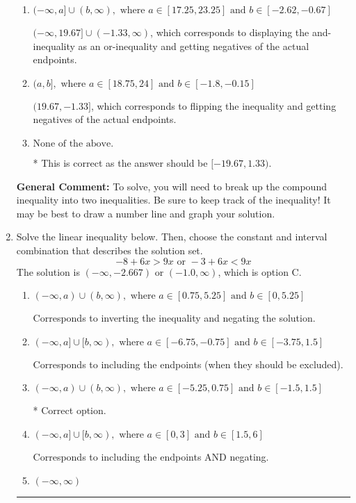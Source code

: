 \documentclass{extbook}[14pt]
\newcommand{\litem}[1]{\item #1

\rule{\textwidth}{0.4pt}}
\begin{document}
\begin{enumerate}
{\begin{enumerate}[label=\Alph*.]
$[19.67, -1.33)$, which is the correct interval but negatives of the actual endpoints.
\item \( (-\infty, a] \cup (b, \infty), \text{ where } a \in [17.25, 23.25] \text{ and } b \in [-2.62, -0.67] \)

$(-\infty, 19.67] \cup (-1.33, \infty)$, which corresponds to displaying the and-inequality as an or-inequality and getting negatives of the actual endpoints.
\item \( (a, b], \text{ where } a \in [18.75, 24] \text{ and } b \in [-1.8, -0.15] \)

$(19.67, -1.33]$, which corresponds to flipping the inequality and getting negatives of the actual endpoints.
\item \( \text{None of the above.} \)

* This is correct as the answer should be $[-19.67, 1.33)$.
\end{enumerate}

\textbf{General Comment:} To solve, you will need to break up the compound inequality into two inequalities. Be sure to keep track of the inequality! It may be best to draw a number line and graph your solution.
}
\litem{
Solve the linear inequality below. Then, choose the constant and interval combination that describes the solution set.
\[ -8 + 6 x > 9 x \text{ or } -3 + 6 x < 9 x \]The solution is \( (-\infty, -2.667) \text{ or } (-1.0, \infty) \), which is option C.\begin{enumerate}[label=\Alph*.]
\item \( (-\infty, a) \cup (b, \infty), \text{ where } a \in [0.75, 5.25] \text{ and } b \in [0, 5.25] \)

Corresponds to inverting the inequality and negating the solution.
\item \( (-\infty, a] \cup [b, \infty), \text{ where } a \in [-6.75, -0.75] \text{ and } b \in [-3.75, 1.5] \)

Corresponds to including the endpoints (when they should be excluded).
\item \( (-\infty, a) \cup (b, \infty), \text{ where } a \in [-5.25, 0.75] \text{ and } b \in [-1.5, 1.5] \)

 * Correct option.
\item \( (-\infty, a] \cup [b, \infty), \text{ where } a \in [0, 3] \text{ and } b \in [1.5, 6] \)

Corresponds to including the endpoints AND negating.
\item \( (-\infty, \infty) \)


\end{enumerate}}
\end{enumerate}
\end{document}
